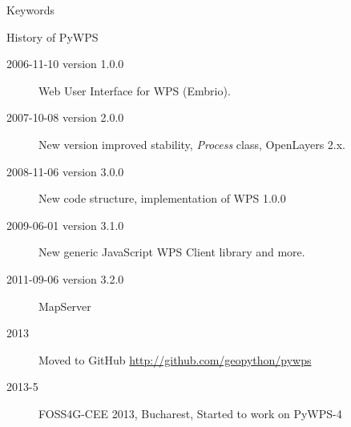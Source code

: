 \documentclass[xcolor=dvipsnames]{beamer}
\begin{document}
\begin{frame}{Keywords}
\begin{center}
    \end{center}
\end{frame}

\begin{frame}{History of PyWPS}
\begin{description}
    \item[2006-11-10 version 1.0.0] Web User Interface for WPS (Embrio).
    \item[2007-10-08 version 2.0.0] New version improved stability, {\em Process} class, OpenLayers 2.x.
    \item[2008-11-06 version 3.0.0] New code structure, implementation of WPS 1.0.0
    \item[2009-06-01 version 3.1.0] New generic JavaScript WPS Client library and more.
    \item[2011-09-06 version 3.2.0] MapServer
    \item[2013] Moved to GitHub \url{http://github.com/geopython/pywps}
    \item[2013-5] FOSS4G-CEE 2013, Bucharest, Started to work on PyWPS-4
\end{description}
\end{frame}
\end{document}
